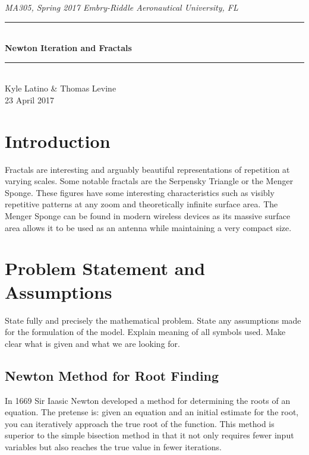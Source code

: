 \documentclass[11pt]{article}
\newcommand{\horrule}[1]{\rule{\linewidth}{#1}} 	%
\begin{document}
\begin{center}
{\it MA305, Spring 2017 \hfill Embry-Riddle Aeronautical University, FL 
 }
		\horrule{0.5pt} \\[0.4cm]
		{\bf \Large  Newton Iteration and Fractals}\\
		\horrule{2pt} \\[2cm]
Kyle Latino \& Thomas Levine
\\[0.4cm]
23 April 2017 %
\end{center}
\thispagestyle{empty}
\newpage
\begin{abstract}

\end{abstract}
\tableofcontents 
\newpage

\section{Introduction}\label{S:1}
Fractals are interesting and arguably beautiful representations of repetition at varying scales. Some notable fractals are the Serpensky Triangle or the Menger Sponge. These figures have some interesting characteristics such as visibly repetitive patterns at any zoom and theoretically infinite surface area. The Menger Sponge can be found in modern wireless devices as its massive surface area allows it to be used as an antenna while maintaining a very compact size.


\section{Problem Statement and Assumptions}\label{S:2}
State fully and precisely the mathematical problem. 
State any assumptions made for the formulation of the model. 
Explain meaning of all symbols used. Make clear what is given and what we are looking for. 


\subsection{Newton Method for Root Finding}\label{S:2.1}
In 1669 Sir Iaasic Newton developed a method for determining the roots of an equation. The pretense is: given an equation and an initial estimate for the root, you can iteratively approach the true root of the function. This method is superior to the simple bisection method in that it not only requires fewer input variables but also reaches the true value in fewer iterations. 
\end{document}
